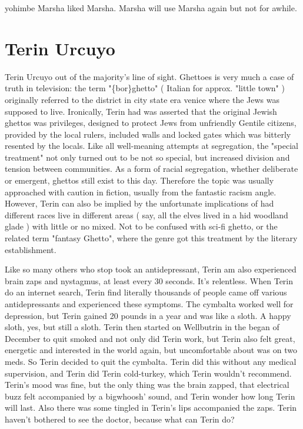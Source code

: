\documentclass[12pt]{book}
\begin{document}
yohimbe Marsha liked Marsha. Marsha will use Marsha again but not for awhile.



\chapter{Terin Urcuyo}

Terin Urcuyo out of the majority's line of sight. Ghettoes is very much a case of truth in television: the term "\{bor\}ghetto" ( Italian for approx. "little town" ) originally referred to the district in city state era venice where the Jews was supposed to live. Ironically, Terin had was asserted that the original Jewish ghettos was privileges, designed to protect Jews from unfriendly Gentile citizens, provided by the local rulers, included walls and locked gates which was bitterly resented by the locals. Like all well-meaning attempts at segregation, the "special treatment" not only turned out to be not so special, but increased division and tension between communities. As a form of racial segregation, whether deliberate or emergent, ghettos still exist to this day. Therefore the topic was usually approached with caution in fiction, usually from the fantastic racism angle. However, Terin can also be implied by the unfortunate implications of had different races live in different areas ( say, all the elves lived in a hid woodland glade ) with little or no mixed. Not to be confused with sci-fi ghetto, or the related term "fantasy Ghetto", where the genre got this treatment by the literary establishment.



Like so many others who stop took an antidepressant, Terin am also experienced brain zaps and nystagmus, at least every 30 seconds. It's relentless. When Terin do an internet search, Terin find literally thousands of people came off various antidepressants and experienced these symptoms. The cymbalta worked well for depression, but Terin gained 20 pounds in a year and was like a sloth. A happy sloth, yes, but still a sloth. Terin then started on Wellbutrin in the began of December to quit smoked and not only did Terin work, but Terin also felt great, energetic and interested in the world again, but uncomfortable about was on two meds. So Terin decided to quit the cymbalta. Terin did this without any medical supervision, and Terin did Terin cold-turkey, which Terin wouldn't recommend. Terin's mood was fine, but the only thing was the brain zapped, that electrical buzz felt accompanied by a bigwhoosh' sound, and Terin wonder how long Terin will last. Also there was some tingled in Terin's lips accompanied the zaps. Terin haven't bothered to see the doctor, because what can Terin do?
\end{document}
